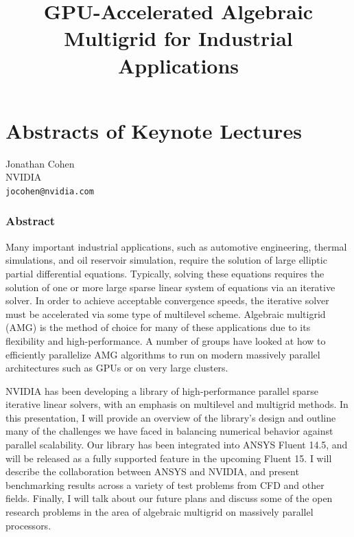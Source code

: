 \documentclass[article, A4, 11pt]{llncs}%
\begin{document}

\tableofcontents

\part{Abstracts of Keynote Lectures}

\pagestyle{plain}

\title{GPU-Accelerated Algebraic Multigrid for Industrial Applications}
 \author{} \institute{}
\maketitle
\begin{center}
{\large Jonathan Cohen}\\
NVIDIA\\
{\tt jocohen@nvidia.com}
\end{center}

\section*{Abstract}
Many important industrial applications, such as automotive engineering, thermal simulations, and oil reservoir simulation, require the solution of large elliptic partial differential equations.  Typically, solving these equations requires the solution of one or more large sparse linear system of equations via an iterative solver.  In order to achieve acceptable convergence speeds, the iterative solver must be accelerated via some type of multilevel scheme.  Algebraic multigrid (AMG) is the method of choice for many of these applications due to its flexibility and high-performance.  A number of groups have looked at how to efficiently parallelize AMG algorithms to run on modern massively parallel architectures such as GPUs or on very large clusters.

NVIDIA has been developing a library of high-performance parallel sparse iterative linear solvers, with an emphasis on multilevel and multigrid methods.  In this presentation, I will provide an overview of the library’s design and outline many of the challenges we have faced in balancing numerical behavior against parallel scalability.  Our library has been integrated into ANSYS Fluent 14.5, and will be released as a fully supported feature in the upcoming Fluent 15.  I will describe the collaboration between ANSYS and NVIDIA, and present benchmarking results across a variety of test problems from CFD and other fields.  Finally, I will talk about our future plans and discuss some of the open research problems in the area of algebraic multigrid on massively parallel processors.
\end{document}
